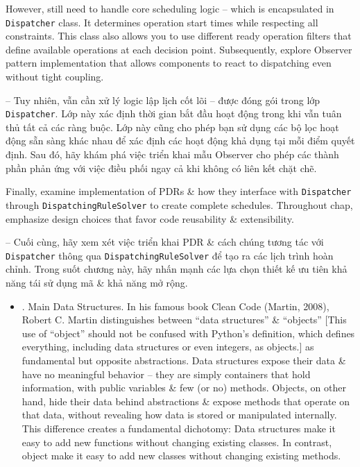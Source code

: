 \documentclass{article}
\begin{document}
\begin{itemize}
    However, still need to handle core scheduling logic -- which is encapsulated in {\tt Dispatcher} class. It determines operation start times while respecting all constraints. This class also allows you to use different ready operation filters that define available operations at each decision point. Subsequently, explore Observer pattern implementation that allows components to react to dispatching even without tight coupling.

    -- Tuy nhiên, vẫn cần xử lý logic lập lịch cốt lõi -- được đóng gói trong lớp {\tt Dispatcher}. Lớp này xác định thời gian bắt đầu hoạt động trong khi vẫn tuân thủ tất cả các ràng buộc. Lớp này cũng cho phép bạn sử dụng các bộ lọc hoạt động sẵn sàng khác nhau để xác định các hoạt động khả dụng tại mỗi điểm quyết định. Sau đó, hãy khám phá việc triển khai mẫu Observer cho phép các thành phần phản ứng với việc điều phối ngay cả khi không có liên kết chặt chẽ.

    Finally, examine implementation of PDRs \& how they interface with {\tt Dispatcher} through {\tt DispatchingRuleSolver} to create complete schedules. Throughout chap, emphasize design choices that favor code reusability \& extensibility.

    -- Cuối cùng, hãy xem xét việc triển khai PDR \& cách chúng tương tác với {\tt Dispatcher} thông qua {\tt DispatchingRuleSolver} để tạo ra các lịch trình hoàn chỉnh. Trong suốt chương này, hãy nhấn mạnh các lựa chọn thiết kế ưu tiên khả năng tái sử dụng mã \& khả năng mở rộng.
    \begin{itemize}
        \item {. Main Data Structures.} In his famous book Clean Code (Martin, 2008), {\sc Robert C. Martin} distinguishes between ``data structures'' \& ``objects'' [This use of ``object'' should not be confused with Python's definition, which defines everything, including data structures or even integers, as objects.] as fundamental but opposite abstractions. Data structures expose their data \& have no meaningful behavior -- they are simply containers that hold information, with public variables \& few (or no) methods. Objects, on other hand, hide their data behind abstractions \& expose methods that operate on that data, without revealing how data is stored or manipulated internally. This difference creates a fundamental dichotomy: Data structures make it easy to add new functions without changing existing classes. In contrast, object make it easy to add new classes without changing existing methods.


\end{itemize}
\end{itemize}
\end{document}
